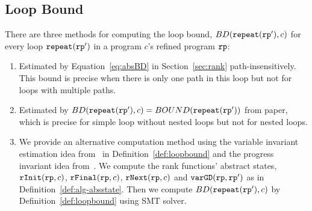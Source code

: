 
\subsection{Loop Bound}
There are three methods for computing the loop bound, $BD(\mathtt{repeat}(\mathtt{rp}'), c)$ for every loop $\mathtt{repeat}(\mathtt{rp}')$ in a program $c$'s refined program $\mathtt{rp}$:
\begin{enumerate}
  \item Estimated by Equation~\ref{eq:absBD} in Section~\ref{sec:rank} path-insensitively. This bound is precise when there is only one path in this loop but not for loops with multiple paths.
  \item Estimated by $BD(\mathtt{repeat}(\mathtt{rp}'), c) = BOUND(\mathtt{repeat}(\mathtt{rp}'))$ from paper\cite{GulwaniJK09}, which is precise for simple loop without nested loops but not for nested loops. 
  \item   We provide an alternative computation method using the variable invariant estimation idea from~\cite{sinn2017complexity} in Definition~\ref{def:loopbound} and the progress invariant idea from~\cite{GulwaniJK09}.
  We compute the rank functions' abstract states, $\mathtt{rInit}(\mathtt{rp}, c)$, $\mathtt{rFinal}(\mathtt{rp}, c)$, $\mathtt{rNext}(\mathtt{rp}, c)$ and $\mathtt{varGD}(\mathtt{rp}, \mathtt{rp}')$ as in Definition~\ref{def:alg-absstate}.
  Then we compute $BD(\mathtt{repeat}(\mathtt{rp}'), c)$ by Definition~\ref{def:loopbound} using SMT solver.
\end{enumerate}
%
